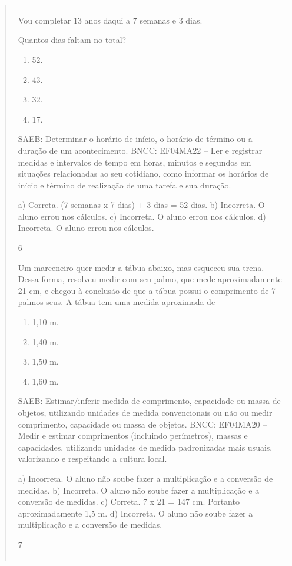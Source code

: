 \begin{mdframed}[linewidth=2pt,linecolor=salmao,roundcorner=2pt]
\begin{itemize}
{\begin{itemize}
\begin{escolha}
{\begin{quote}
{\begin{escolha}
{{{{{\begin{longtable}[]{@{}l@{}}
\begin{itemize}
{Vou completar 13 anos daqui a 7 semanas e 3 dias.

Quantos dias faltam no total?

\begin{enumerate}
\item
  52.
\item
  43.
\item
  32.
\item
  17.
\end{enumerate}

SAEB: Determinar o horário de início, o horário de término ou
a duração de um acontecimento.
BNCC: EF04MA22 -- Ler e registrar medidas e intervalos de tempo em horas, minutos e segundos em
situações relacionadas ao seu cotidiano, como informar os horários de início e término de realização
de uma tarefa e sua duração.

a) Correta. (7 semanas x 7 dias) + 3 dias = 52 dias.
b) Incorreta. O aluno errou nos cálculos.
c) Incorreta. O aluno errou nos cálculos.
d) Incorreta. O aluno errou nos cálculos.

\num{6}

Um marceneiro quer medir a tábua abaixo, mas esqueceu sua trena. Dessa
forma, resolveu medir com seu palmo, que mede aproximadamente 21 cm, e
chegou à conclusão de que a tábua possui o comprimento
de 7 palmos seus. A tábua tem uma medida aproximada de

\begin{enumerate}
\item
  1,10 m.
\item
  1,40 m.
\item
  1,50 m.
\item
  1,60 m.
\end{enumerate}

SAEB: Estimar/inferir medida de comprimento, capacidade ou
massa de objetos, utilizando unidades de medida convencionais ou não ou
medir comprimento, capacidade ou massa de objetos.
BNCC: EF04MA20 -- Medir e estimar comprimentos (incluindo perímetros), massas e capacidades, utilizando
unidades de medida padronizadas mais usuais, valorizando e respeitando a cultura local.

a) Incorreta. O aluno não soube fazer a multiplicação e a conversão de medidas.
b) Incorreta. O aluno não soube fazer a multiplicação e a conversão de medidas.
c) Correta. 7 x 21 = 147 cm. Portanto aproximadamente 1,5 m.
d) Incorreta. O aluno não soube fazer a multiplicação e a conversão de medidas.

\num{7}

}
\end{itemize}
\end{longtable}}}}}}
\end{escolha}}
\end{quote}}
\end{escolha}
\end{itemize}}
\end{itemize}
\end{mdframed}
